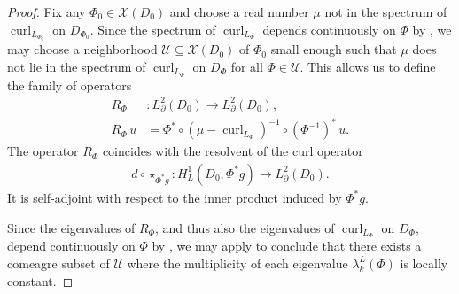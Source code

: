 \documentclass[11pt,reqno]{amsart}
\DeclareMathOperator{\curl}{curl}
\begin{document}
\begin{proof}
    Fix any $\Phi_0 \in \mathcal X(D_0)$ and choose a real number $\mu$ not in the spectrum of $\curl_{L_{\Phi_0}}$ on $D_{\Phi_0}$. Since the spectrum of $\curl_{L_\Phi}$ depends continuously on $\Phi$ by , we may choose a neighborhood $\mathcal U \subseteq \mathcal X(D_0)$ of $\Phi_0$ small enough such that $\mu$ does not lie in the spectrum of $\curl_{L_{\Phi}}$ on $D_\Phi$ for all $\Phi \in \mathcal U$. This allows us to define the family of operators
    \begin{align*}
        R_\Phi&: L^2_\partial(D_0) \to L^2_\partial(D_0), \\
        R_\Phi \, u &= \Phi^\ast \circ (\mu-\curl_{L_\Phi})^{-1} \circ (\Phi^{-1})^\ast \, u.
    \end{align*}
    The operator $R_\Phi$ coincides with the resolvent of the curl operator 
    \begin{align*}
        d \circ \star_{\Phi^\ast g} : H^1_{L}(D_0,\Phi^\ast g) \to L^2_\partial(D_0).
    \end{align*}
    It is self-adjoint with respect to the inner product induced by $\Phi^\ast g$.

    Since the eigenvalues of $R_\Phi$, and thus also the eigenvalues of $\curl_{L_\Phi}$ on $D_\Phi$, depend continuously on $\Phi$ by , we may apply  to conclude that there exists a comeagre subset of $\mathcal U$ where the multiplicity of each eigenvalue $\lambda_k^L(\Phi)$ is locally constant.


\end{proof}
\end{document}
